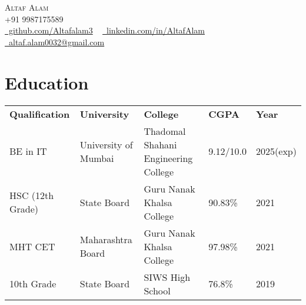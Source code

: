 \documentclass[letterpaper,11pt]{article}
\begin{document}

\begin{center}
    {\huge \scshape Altaf Alam} \\ 
    \vspace{4pt}
    {\scshape +91 9987175589} \\ 
    \vspace{4pt}
    \small
    \faGithub \href{https://github.com/Altafalam3}{\raisebox{-0.2\height}\ github.com/Altafalam3} ~
    \faLinkedin \href{https://linkedin.com/in/altaf-alam-432849234}{\raisebox{-0.2\height}\ linkedin.com/in/AltafAlam} ~
    \faEnvelope \href{mailto:contact@altaf.alam0032@gmail.com}{\raisebox{-0.2\height}\  altaf.alam0032@gmail.com}
    \vspace{1pt}
\end{center}


\section{Education}
    \vspace{-4pt}
    \begin{itemize}[leftmargin=0.2in, label={}]
        {\item{
            \begin{tabular}{ l@{\hskip 0.2in} l@{\hskip 0.2in} l@{\hskip 0.2in} l@{\hskip 0.2in} l }
                 \textbf{Qualification} & \textbf{University} & \textbf{College} & \textbf{CGPA} & \textbf{Year} \\
                 BE in IT & University of Mumbai & Thadomal Shahani Engineering College & 9.12/10.0 & 2025(exp)  \\
                 HSC (12th Grade) & State Board & Guru Nanak Khalsa College & 90.83\% & 2021 \\
                 MHT CET & Maharashtra Board & Guru Nanak Khalsa College & 97.98\% & 2021 \\
                 10th Grade & State Board & SIWS High School & 76.8\% & 2019
            \end{tabular}
        }}
    \end{itemize}
\vspace{-12pt}
\end{document}
